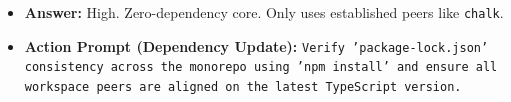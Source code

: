\begin{itemize}
  \begin{itemize}
  \tightlist
  \item
    \textbf{Answer:} High. Zero-dependency core. Only uses established peers like \texttt{c\allowbreak{}h\allowbreak{}a\allowbreak{}l\allowbreak{}k}.
  \item
    \textbf{Action Prompt (Dependency Update):} \texttt{V\allowbreak{}e\allowbreak{}r\allowbreak{}i\allowbreak{}f\allowbreak{}y\allowbreak{} \allowbreak{}'\allowbreak{}p\allowbreak{}a\allowbreak{}c\allowbreak{}k\allowbreak{}a\allowbreak{}g\allowbreak{}e\allowbreak{}-\allowbreak{}l\allowbreak{}o\allowbreak{}c\allowbreak{}k\allowbreak{}.\allowbreak{}j\allowbreak{}s\allowbreak{}o\allowbreak{}n\allowbreak{}'\allowbreak{} \allowbreak{}c\allowbreak{}o\allowbreak{}n\allowbreak{}s\allowbreak{}i\allowbreak{}s\allowbreak{}t\allowbreak{}e\allowbreak{}n\allowbreak{}c\allowbreak{}y\allowbreak{} \allowbreak{}a\allowbreak{}c\allowbreak{}r\allowbreak{}o\allowbreak{}s\allowbreak{}s\allowbreak{} \allowbreak{}t\allowbreak{}h\allowbreak{}e\allowbreak{} \allowbreak{}m\allowbreak{}o\allowbreak{}n\allowbreak{}o\allowbreak{}r\allowbreak{}e\allowbreak{}p\allowbreak{}o\allowbreak{} \allowbreak{}u\allowbreak{}s\allowbreak{}i\allowbreak{}n\allowbreak{}g\allowbreak{} \allowbreak{}'\allowbreak{}n\allowbreak{}p\allowbreak{}m\allowbreak{} \allowbreak{}i\allowbreak{}n\allowbreak{}s\allowbreak{}t\allowbreak{}a\allowbreak{}l\allowbreak{}l\allowbreak{}'\allowbreak{} \allowbreak{}a\allowbreak{}n\allowbreak{}d\allowbreak{} \allowbreak{}e\allowbreak{}n\allowbreak{}s\allowbreak{}u\allowbreak{}r\allowbreak{}e\allowbreak{} \allowbreak{}a\allowbreak{}l\allowbreak{}l\allowbreak{} \allowbreak{}w\allowbreak{}o\allowbreak{}r\allowbreak{}k\allowbreak{}s\allowbreak{}p\allowbreak{}a\allowbreak{}c\allowbreak{}e\allowbreak{} \allowbreak{}p\allowbreak{}e\allowbreak{}e\allowbreak{}r\allowbreak{}s\allowbreak{} \allowbreak{}a\allowbreak{}r\allowbreak{}e\allowbreak{} \allowbreak{}a\allowbreak{}l\allowbreak{}i\allowbreak{}g\allowbreak{}n\allowbreak{}e\allowbreak{}d\allowbreak{} \allowbreak{}o\allowbreak{}n\allowbreak{} \allowbreak{}t\allowbreak{}h\allowbreak{}e\allowbreak{} \allowbreak{}l\allowbreak{}a\allowbreak{}t\allowbreak{}e\allowbreak{}s\allowbreak{}t\allowbreak{} \allowbreak{}T\allowbreak{}y\allowbreak{}p\allowbreak{}e\allowbreak{}S\allowbreak{}c\allowbreak{}r\allowbreak{}i\allowbreak{}p\allowbreak{}t\allowbreak{} \allowbreak{}v\allowbreak{}e\allowbreak{}r\allowbreak{}s\allowbreak{}i\allowbreak{}o\allowbreak{}n\allowbreak{}.}
  \end{itemize}
\end{itemize}

